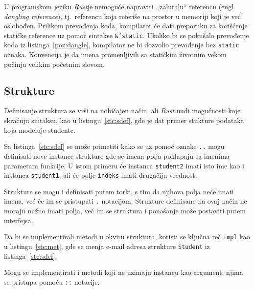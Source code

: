 \documentclass[12pt,oneside]{memoir}
\begin{document}
U programskom jeziku \emph{Rust}je nemoguće napraviti
,,zalutalu`` referencu (engl. \emph{dangling reference}),
tj.\ referencu koja referiše na prostor u memoriji koji je već oslobođen. Prilikom prevođenja
koda, kompilator će dati preporuku za korišćenje statičke reference uz pomoć sintakse
\texttt{\&'static}. Ukoliko bi se pokušalo prevođenje koda iz listinga~\ref{poz:dangle},
kompilator ne bi dozvolio prevođenje bez \texttt{static} oznaka. Konvencija je da imena
promenljivih sa statičkim životnim vekom počinju velikim početnim slovom.



\subsection{Strukture}
Definisanje struktura se vrši na uobičajen način, ali \emph{Rust} nudi mogućnosti koje skraćuju
sintaksu, kao u listingu~\ref{stc:sdef}, gde je dat primer stukture podataka koja modeluje
studente.



Sa listinga~\ref{stc:sdef} se može primetiti kako se uz pomoć oznake \texttt{..} mogu definisati
nove instance strukture gde se imena
polja poklapaju sa imenima parametara funkcije. U istom primeru će instanca \texttt{student2}
imati isto ime kao i instanca \texttt{student1}, ali će polje \texttt{indeks} imati
drugačiju vrednost.

Strukture se mogu i definisati putem torki, s tim da njihova polja neće imati imena, već će
im se pristupati \texttt{.} notacijom. Strukture definisane na ovaj način ne moraju nužno imati
polja, već im se struktura i ponašanje može postaviti putem interfejsa.

Da bi se implementirali metodi u okviru struktura, koristi se ključna reč \texttt{impl} kao u
listingu~\ref{stc:met}, gde se menja e-mail adresa strukture \texttt{Student} iz
listinga~\ref{stc:sdef}.



\noindent
Mogu se implementirati i metodi koji ne uzimaju instancu kao argument; njima se pristupa pomoću
\texttt{::} notacije.
\end{document}
